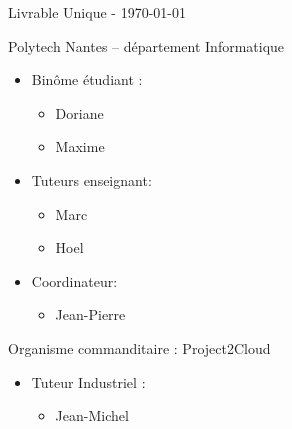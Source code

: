 \begin{titlepage} 
\begin{center} \large {Livrable Unique - \today} \end{center}
\vfill 



\Large Polytech Nantes – département Informatique
\vspace{0,5cm}

\begin{itemize}
	\item[]{\large Binôme étudiant :
	\vspace{0,25cm}
	
	\normalsize
	\begin{itemize}
		\item Doriane 
		\item Maxime 
	\end{itemize}
	}
	\vspace{0,5cm}

	\item[]{\large Tuteurs enseignant:
	\vspace{0,25cm}
	
	\normalsize
	\begin{indent}
		\begin{itemize}
			\item Marc 
			\item Hoel 
		\end{itemize}
	\end{indent}
	}
	\vspace{0,5cm}

	\item[]{\large Coordinateur:
	\vspace{0,25cm}
	
	\normalsize
	\begin{itemize}
		\item Jean-Pierre 
	\end{itemize}
	}
\end{itemize}
\vspace{1cm}



\Large Organisme commanditaire : Project2Cloud 
\vspace{0,5cm}

\begin{itemize}
	\item[]{\large Tuteur Industriel :
		\vspace{0,25cm}
		
		\normalsize
		\begin{itemize}
			\item Jean-Michel 
		\end{itemize}
	}
\end{itemize}	

\vfill 


\end{titlepage}